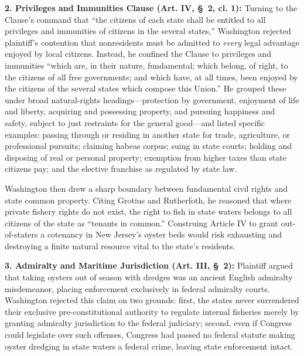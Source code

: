 \documentclass[12pt]{article}
\begin{document}
\textbf{2. Privileges and Immunities Clause (Art. IV, \S\ 2, cl. 1):} Turning to the Clause's command that ``the citizens of each state shall be entitled to all privileges and immunities of citizens in the several states,'' Washington rejected plaintiff's contention that nonresidents must be admitted to \textit{every} legal advantage enjoyed by local citizens. Instead, he confined the Clause to privileges and immunities ``which are, in their nature, fundamental; which belong, of right, to the citizens of all free governments; and which have, at all times, been enjoyed by the citizens of the several states which compose this Union.'' He grouped these under broad natural-rights headings---protection by government, enjoyment of life and liberty, acquiring and possessing property, and pursuing happiness and safety, subject to just restraints for the general good---and listed specific examples: passing through or residing in another state for trade, agriculture, or professional pursuits; claiming habeas corpus; suing in state courts; holding and disposing of real or personal property; exemption from higher taxes than state citizens pay; and the elective franchise as regulated by state law.

Washington then drew a sharp boundary between fundamental civil rights and state common property. Citing Grotius and Rutherfoth, he reasoned that where private fishery rights do not exist, the right to fish in state waters belongs to all citizens of the state as ``tenants in common.'' Construing Article IV to grant out-of-staters a cotenancy in New Jersey's oyster beds would risk exhausting and destroying a finite natural resource vital to the state's residents.

\textbf{3. Admiralty and Maritime Jurisdiction (Art. III, \S\ 2):} Plaintiff argued that taking oysters out of season with dredges was an ancient English admiralty misdemeanor, placing enforcement exclusively in federal admiralty courts. Washington rejected this claim on two grounds: first, the states never surrendered their exclusive pre-constitutional authority to regulate internal fisheries merely by granting admiralty jurisdiction to the federal judiciary; second, even if Congress could legislate over such offenses, Congress had passed no federal statute making oyster dredging in state waters a federal crime, leaving state enforcement intact.
\end{document}
